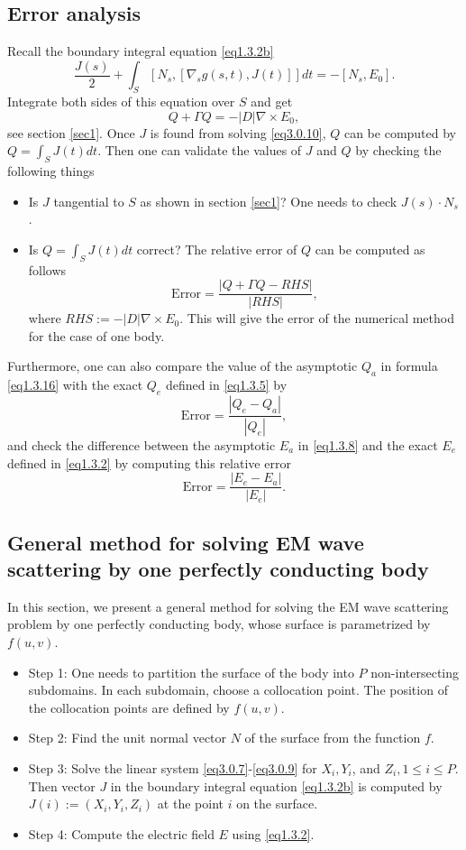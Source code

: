 \documentclass[12pt]{article}
\numberwithin{equation}{section}
\newcommand{\be}{\begin{equation}}
\newcommand{\ee}{\end{equation}}
\begin{document}
\subsection{Error analysis}\label{sec3.1.1}
Recall the boundary integral equation \eqref{eq1.3.2b}
\be \label{eq3.0.10}
    \frac{J(s)}{2}+\int_S [N_s,[\nabla_s g(s,t),J(t)]]dt=-[N_s,E_0].
\ee
Integrate both sides of this equation over $S$ and get
\be \label{eq3.0.11}
    Q+\Gamma Q=-|D| \nabla\times E_0,
\ee
see section \ref{sec1}. Once $J$ is found from solving \eqref{eq3.0.10}, $Q$ can be computed by $Q=\int_S J(t)dt$.
Then one can validate the values of $J$ and $Q$ by checking the following things
\begin{itemize}
\item Is $J$ tangential to $S$ as shown in section \ref{sec1}? One needs to check $J(s)\cdot N_s$.
\item Is $Q=\int_S J(t)dt$ correct? The relative error of $Q$ can be computed as follows
\be \label{eq3.0.12}
    \text{Error} = \frac{|Q+\Gamma Q-RHS|}{|RHS|},
\ee
where $RHS:=-|D| \nabla\times E_0$. This will give the error of the numerical method for the case of one body.
\end{itemize}
Furthermore, one can also compare the value of the asymptotic $Q_a$ in formula \eqref{eq1.3.16} with the exact $Q_e$ defined in \eqref{eq1.3.5} by
\be \label{eq3.0.13}
    \text{Error} = \frac{|Q_e-Q_a|}{|Q_e|},
\ee
and check the difference between the asymptotic $E_a$ in \eqref{eq1.3.8} and the exact $E_e$ defined in \eqref{eq1.3.2} by computing this relative error
\be \label{eq3.0.14}
    \text{Error} = \frac{|E_e-E_a|}{|E_e|}.
\ee

\subsection{General method for solving EM wave scattering by one perfectly conducting body}\label{sec3.4}
In this section, we present a general method for solving the EM wave scattering problem by one perfectly conducting body, whose surface is parametrized by $f(u,v)$.

\begin{itemize}
\item Step 1: One needs to partition the surface of the body into $P$ non-intersecting subdomains. In each subdomain, choose a collocation point. The position of the collocation points are defined by $f(u,v)$.
\item Step 2: Find the unit normal vector $N$ of the surface from the function $f$.
\item Step 3: Solve the linear system \eqref{eq3.0.7}-\eqref{eq3.0.9} for $X_i,Y_i$, and $Z_i, 1 \le i \le P$. Then vector $J$ in the boundary integral equation \eqref{eq1.3.2b} is computed by $J(i):=(X_i,Y_i,Z_i)$ at the point $i$ on the surface.
\item Step 4: Compute the electric field $E$ using \eqref{eq1.3.2}.
\end{itemize}
\end{document}
